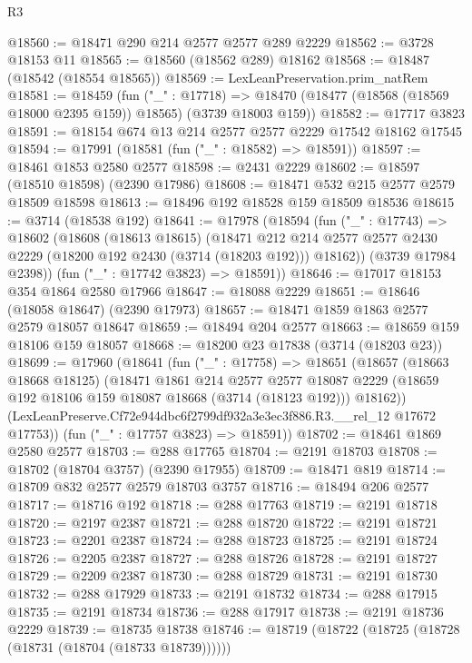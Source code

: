 \begin{lexlean}{R3}
\begin{coremodule}
@18560 := @18471 @290 @214 @2577 @2577 @289 @2229
@18562 := @3728 @18153 @11
@18565 := @18560 (@18562 @289) @18162
@18568 := @18487 (@18542 (@18554 @18565))
@18569 := LexLeanPreservation.prim_natRem
@18581 := @18459
    (fun ("_" : @17718) =>
    @18470 (@18477 (@18568 (@18569 @18000 @2395 @159)) @18565) (@3739 @18003 @159))
@18582 := @17717 @3823
@18591 := @18154 @674 @13 @214 @2577 @2577 @2229 @17542 @18162 @17545
@18594 := @17991 (@18581 (fun ("_" : @18582) => @18591))
@18597 := @18461 @1853 @2580 @2577
@18598 := @2431 @2229
@18602 := @18597 (@18510 @18598) (@2390 @17986)
@18608 := @18471 @532 @215 @2577 @2579 @18509 @18598
@18613 := @18496 @192 @18528 @159 @18509 @18536
@18615 := @3714 (@18538 @192)
@18641 := @17978
    (@18594
      (fun ("_" : @17743) =>
      @18602
        (@18608
          (@18613 @18615)
          (@18471
            @212
            @214
            @2577
            @2577
            @2430
            @2229
            (@18200 @192 @2430 (@3714 (@18203 @192)))
            @18162))
        (@3739 @17984 @2398))
      (fun ("_" : @17742 @3823) => @18591))
@18646 := @17017 @18153 @354 @1864 @2580 @17966
@18647 := @18088 @2229
@18651 := @18646 (@18058 @18647) (@2390 @17973)
@18657 := @18471 @1859 @1863 @2577 @2579 @18057 @18647
@18659 := @18494 @204 @2577
@18663 := @18659 @159 @18106 @159 @18057
@18668 := @18200 @23 @17838 (@3714 (@18203 @23))
@18699 := @17960
    (@18641
      (fun ("_" : @17758) =>
      @18651
        (@18657
          (@18663 @18668 @18125)
          (@18471
            @1861
            @214
            @2577
            @2577
            @18087
            @2229
            (@18659 @192 @18106 @159 @18087 @18668 (@3714 (@18123 @192)))
            @18162))
        (LexLeanPreserve.Cf72e944dbc6f2799df932a3e3ec3f886.R3.__rel_12 @17672 @17753))
      (fun ("_" : @17757 @3823) => @18591))
@18702 := @18461 @1869 @2580 @2577
@18703 := @288 @17765
@18704 := @2191 @18703
@18708 := @18702 (@18704 @3757) (@2390 @17955)
@18709 := @18471 @819
@18714 := @18709 @832 @2577 @2579 @18703 @3757
@18716 := @18494 @206 @2577
@18717 := @18716 @192
@18718 := @288 @17763
@18719 := @2191 @18718
@18720 := @2197 @2387
@18721 := @288 @18720
@18722 := @2191 @18721
@18723 := @2201 @2387
@18724 := @288 @18723
@18725 := @2191 @18724
@18726 := @2205 @2387
@18727 := @288 @18726
@18728 := @2191 @18727
@18729 := @2209 @2387
@18730 := @288 @18729
@18731 := @2191 @18730
@18732 := @288 @17929
@18733 := @2191 @18732
@18734 := @288 @17915
@18735 := @2191 @18734
@18736 := @288 @17917
@18738 := @2191 @18736 @2229
@18739 := @18735 @18738
@18746 := @18719 (@18722 (@18725 (@18728 (@18731 (@18704 (@18733 @18739))))))

\end{coremodule}
\end{lexlean}
